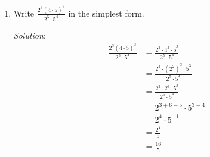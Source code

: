 \documentclass[16pt]{article}
\theoremstyle{remark}
\begin{document}
\begin{enumerate}

\item Write $\displaystyle{\frac{2^3 (4\cdot 5)^3}{2^5 \cdot5^4}}$ in the simplest form.
\begin{mdframed}[style=TheoremFrame]
\textit{Solution}:
\begin{align*}
\frac{2^3 (4\cdot 5)^3}{2^5 \cdot 5^4} &= \frac{2^3 \cdot 4^3 \cdot 5^3}{2^5 \cdot 5^4}\\
&= \frac{2^3 \cdot (2^2)^3 \cdot 5^3}{2^5 \cdot 5^4}\\
&= \frac{2^3 \cdot 2^6 \cdot 5^3}{2^5 \cdot 5^4}\\
&= 2^{3+6-5} \cdot 5^{3-4}\\
&= 2^4 \cdot 5^{-1}\\
&= \frac{2^4}{5}\\
&= \frac{16}{5}
\end{align*}


\end{mdframed}
\end{enumerate}
\end{document}
